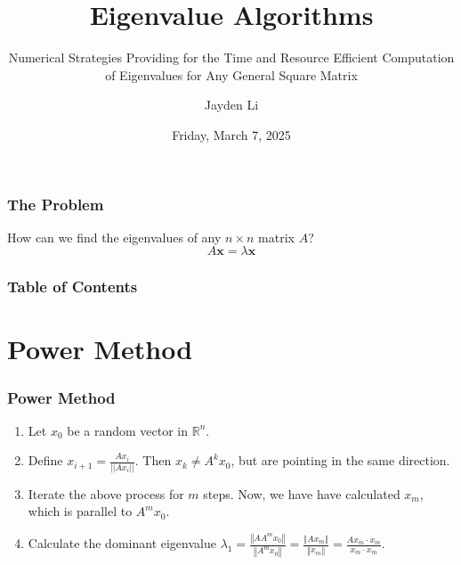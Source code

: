 \documentclass{beamer}
\title{Eigenvalue Algorithms}
\subtitle{Numerical Strategies Providing for the Time and Resource Efficient Computation of Eigenvalues for Any General Square Matrix}
\author{Jayden Li}
\date{Friday, March 7, 2025}
\begin{document}
\frame{\titlepage}

\begin{frame}
\frametitle{The Problem}

\begin{center}
	\begin{tcolorbox}[colback=yellow!5!white,colframe=yellow!75!black,parbox=false,width=0.6\linewidth]
		\centering
		How can we find the eigenvalues of any $n\times n$ matrix $A$?
		\begin{equation*}
			A\mathbf x=\lambda\mathbf x
		\end{equation*}
	\end{tcolorbox}
\end{center}

\end{frame}

\begin{frame}
	\frametitle{Table of Contents}
	\tableofcontents
\end{frame}

\section{Power Method}
\frame{\sectionpage}

\begin{frame}
	\frametitle{Power Method}
	\begin{tcolorbox}[title={Power Method},colback=red!5!white,colframe=red!75!black,parbox=false]
		\begin{enumerate}
			\item<2-> Let $x_0$ be a random vector in $\mathbb R^n$.
			\item<3-> Define $\displaystyle x_{i+1}=\frac{Ax_i}{||Ax_i||}$. Then $x_k\neq A^kx_0$, but are pointing in the same direction.
			\item<4-> Iterate the above process for $m$ steps. Now, we have have calculated $x_m$, which is parallel to $A^m x_0$.
			\item<5-> Calculate the dominant eigenvalue $\displaystyle \lambda_1=\frac{\left\Vert A A^m x_0 \right\Vert}{\left\Vert A^m x_0 \right\Vert}=\frac{\left\Vert A x_m\right\Vert}{\left\Vert x_m \right\Vert}=\frac{Ax_m\cdot x_m}{x_m \cdot x_m}$.
		\end{enumerate}
	\end{tcolorbox}
\end{frame}
\end{document}
